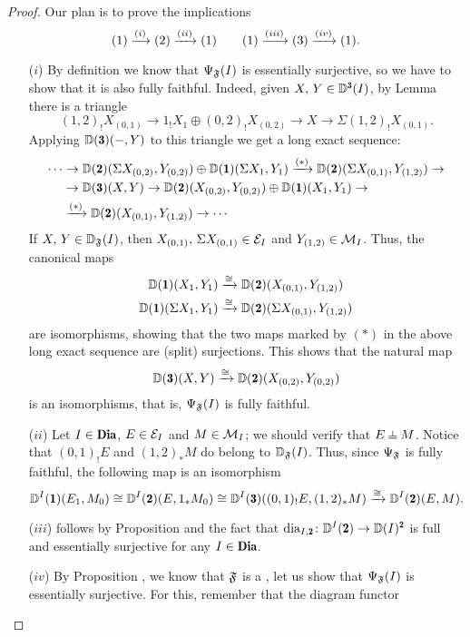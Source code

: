 \begin{proof}
Our plan is to prove the implications
\[
(1)\xrightarrow{(i)}(2)\xrightarrow{(ii)}(1)\qquad (1)\xrightarrow{(iii)}(3)\xrightarrow{(iv)}(1).
\]
\begin{enumerate}%
\item[($i$)]  By definition we know that $\Psi_{\mathfrak{F}}(I)$ is essentially surjective, so we have to show that it is also fully faithful. Indeed, given $X,\, Y\in \D^{\tre}(I)$, by Lemma  there is a triangle
$$(1,2)_!X_{(0,1)}\to 1_!X_1\oplus (0,2)_!X_{(0,2)}\to X\to \Sigma (1,2)_!X_{(0,1)}.$$
Applying $\D(\tre)(-,Y)$ to this triangle we get a long exact sequence:
\begin{align*}
\cdots&\to \D(\due)(\Sigma X_{(0,2)},Y_{(0,2)})\oplus\D(\uno)(\Sigma X_1,Y_1)\xto{(*)} \D(\due)(\Sigma X_{(0,1)},Y_{(1,2)})\to\notag\\
&\to\D(\tre)(X,Y)\to\D(\due)(X_{(0,2)},Y_{(0,2)})\oplus\D(\uno)(X_1,Y_1)\to\notag\\
&\xto{(*)} \D(\due)(X_{(0,1)},Y_{(1,2)})\to \cdots%
\end{align*}
If $X,\, Y\in\mathbb{D}_{\mathfrak{F}}(I)$, then $X_{(0,1)},\, \Sigma X_{(0,1)}\in \mathcal{E}_I$ and $Y_{(1,2)}\in\mathcal{M}_I$. Thus, the canonical maps
\begin{gather*}
\D(\uno)(X_1,Y_1)\xto{\cong}\D(\due)(X_{(0,1)},Y_{(1,2)})\\
\D(\uno)(\Sigma X_1,Y_1)\xto{\cong}\D(\due)(\Sigma X_{(0,1)},Y_{(1,2)})
\end{gather*}
are isomorphisms, showing that the two maps marked by $(*)$ in the above long exact sequence are (split) surjections. This shows that the natural map
\[
\D(\tre)(X,Y)\xto{\cong} \D(\due)(X_{(0,2)},Y_{(0,2)})
\]
is an isomorphisms, that is, $\Psi_{\mathfrak{F}}(I)$ is fully faithful.
\item[($ii$)]  Let $I\in \Dia$, $E\in \mathcal{E}_I$ and $M\in \mathcal{M}_I$; we should verify that $E\corth M$. Notice that $(0,1)_!E$ and $(1,2)_*M$ do belong to $\mathbb{D}_{\mathfrak{F}}(I)$. Thus, since $\Psi_{\mathfrak{F}}$ is fully faithful, the following map is an isomorphism 
$$\D^I(\uno)(E_1,M_0)\cong\D^I(\due)(E,1_*M_0)\cong\D^I(\tre)((0,1)_!E,(1,2)_*M)\xto{\cong} \D^I(\due)(E,M).$$
\item[($iii$)] follows by Proposition  and the fact that $\dia_{I,\due}\colon \D^I(\due)\to \D(I)^{\due}$ is full and essentially surjective for any $I\in \Dia$. 
\item[($iv$)] By Proposition , we know that $\mathfrak{F}$ is a  \cpfs, let us show that $\Psi_{\mathfrak{F}}(I)$ is essentially surjective. For this, remember that the diagram functor

\end{enumerate}
\end{proof}
